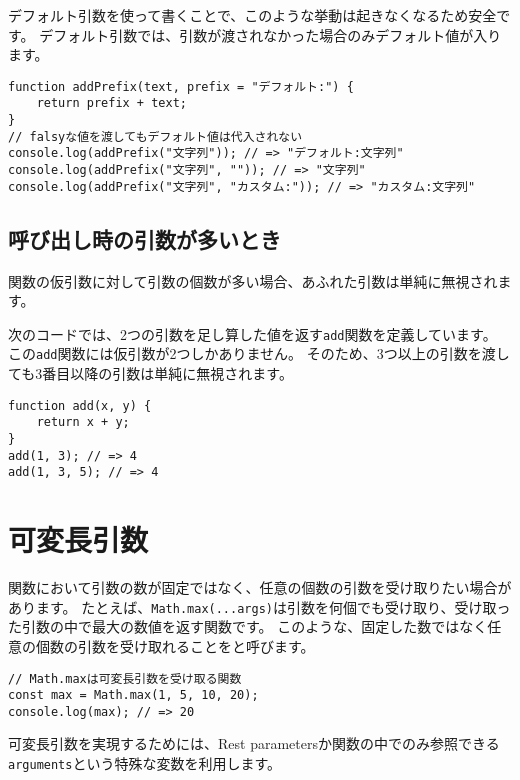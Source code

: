 デフォルト引数を使って書くことで、このような挙動は起きなくなるため安全です。
デフォルト引数では、引数が渡されなかった場合のみデフォルト値が入ります。

\begin{lstlisting}
function addPrefix(text, prefix = "デフォルト:") {
    return prefix + text;
}
// falsyな値を渡してもデフォルト値は代入されない
console.log(addPrefix("文字列")); // => "デフォルト:文字列"
console.log(addPrefix("文字列", "")); // => "文字列"
console.log(addPrefix("文字列", "カスタム:")); // => "カスタム:文字列"
\end{lstlisting}

\hypertarget{function-more-arguments}{%
\subsection{呼び出し時の引数が多いとき}\label{function-more-arguments}}

関数の仮引数に対して引数の個数が多い場合、あふれた引数は単純に無視されます。

次のコードでは、2つの引数を足し算した値を返す\texttt{add}関数を定義しています。
この\texttt{add}関数には仮引数が2つしかありません。
そのため、3つ以上の引数を渡しても3番目以降の引数は単純に無視されます。

\begin{lstlisting}
function add(x, y) {
    return x + y;
}
add(1, 3); // => 4
add(1, 3, 5); // => 4
\end{lstlisting}

\hypertarget{variable-arguments}{%
\section{可変長引数}\label{variable-arguments}}

関数において引数の数が固定ではなく、任意の個数の引数を受け取りたい場合があります。
たとえば、\texttt{Math.max(...args)}は引数を何個でも受け取り、受け取った引数の中で最大の数値を返す関数です。
このような、固定した数ではなく任意の個数の引数を受け取れることを\textbf{}と呼びます。

\begin{lstlisting}
// Math.maxは可変長引数を受け取る関数
const max = Math.max(1, 5, 10, 20);
console.log(max); // => 20
\end{lstlisting}

可変長引数を実現するためには、Rest
parametersか関数の中でのみ参照できる\texttt{arguments}という特殊な変数を利用します。

